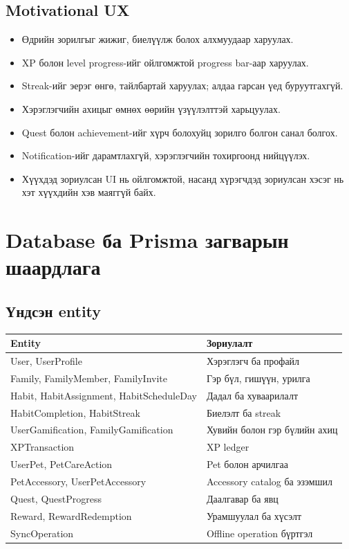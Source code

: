 \documentclass[12pt,a4paper,oneside]{report}
\begin{document}
\section{Motivational UX}
\begin{itemize}
  \item Өдрийн зорилгыг жижиг, биелүүлж болох алхмуудаар харуулах.
  \item XP болон level progress-ийг ойлгомжтой progress bar-аар харуулах.
  \item Streak-ийг эерэг өнгө, тайлбартай харуулах; алдаа гарсан үед буруутгахгүй.
  \item Хэрэглэгчийн ахицыг өмнөх өөрийн үзүүлэлттэй харьцуулах.
  \item Quest болон achievement-ийг хүрч болохуйц зорилго болгон санал болгох.
  \item Notification-ийг дарамтлахгүй, хэрэглэгчийн тохиргоонд нийцүүлэх.
  \item Хүүхдэд зориулсан UI нь ойлгомжтой, насанд хүрэгчдэд зориулсан хэсэг нь хэт хүүхдийн хэв маяггүй байх.
\end{itemize}

\chapter{Database ба Prisma загварын шаардлага}

\section{Үндсэн entity}
\begin{longtable}{p{}p{}}
\toprule
\textbf{Entity} & \textbf{Зориулалт}\\
\midrule
User, UserProfile & Хэрэглэгч ба профайл\\
Family, FamilyMember, FamilyInvite & Гэр бүл, гишүүн, урилга\\
Habit, HabitAssignment, HabitScheduleDay & Дадал ба хуваарилалт\\
HabitCompletion, HabitStreak & Биелэлт ба streak\\
UserGamification, FamilyGamification & Хувийн болон гэр бүлийн ахиц\\
XPTransaction & XP ledger\\
UserPet, PetCareAction & Pet болон арчилгаа\\
PetAccessory, UserPetAccessory & Accessory catalog ба эзэмшил\\
Quest, QuestProgress & Даалгавар ба явц\\
Reward, RewardRedemption & Урамшуулал ба хүсэлт\\
SyncOperation & Offline operation бүртгэл\\
\bottomrule
\end{longtable}
\end{document}
